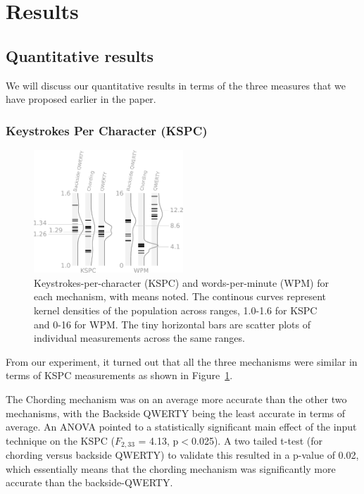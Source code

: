 \section{Results}
\subsection{Quantitative results}

We will discuss our quantitative results in terms of the three
measures that we have proposed earlier in the paper.

\subsubsection{Keystrokes Per Character (KSPC)}

\begin{figure}
    \includegraphics[width=0.5\textwidth]{Figures/kspc_and_wpm.pdf} 
    \caption{Keystrokes-per-character (KSPC) and words-per-minute (WPM) for each mechanism, with means noted. The continous curves represent kernel densities of the population across ranges, 1.0-1.6 for KSPC and 0-16 for WPM. The tiny horizontal bars are scatter plots of individual measurements across the same ranges.}
    \label{fig:kspc_and_wpm}
\end{figure}
From our experiment, it turned out that all the three mechanisms were similar
in terms of KSPC measurements as shown in
Figure~\ref{fig:kspc_and_wpm}.

The Chording mechanism was on an average more accurate than the other two mechanisms, with the Backside QWERTY being the least accurate in terms of average. An ANOVA pointed to a statistically significant main effect of the input technique on the KSPC ($F_{2,33}$ = 4.13, p$<$0.025). A two tailed t-test (for chording versus backside QWERTY) to validate this resulted in a p-value of 0.02, which essentially means that the chording mechanism was significantly more accurate than the backside-QWERTY. 

